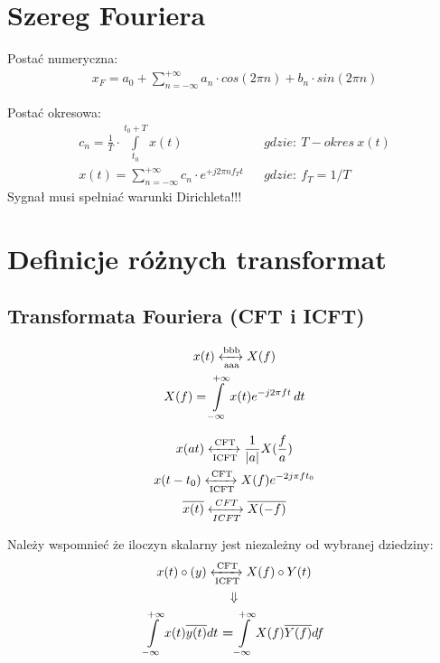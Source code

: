 \section{Szereg Fouriera}
    Postać numeryczna:
    \begin{gather*}
        x_F = a_0 + \sum\limits_{n=-\infty}^{+\infty}a_n\cdot cos\left(2\pi n\right) +b_n\cdot sin\left(2\pi n\right)
    \end{gather*}

    \indent Postać okresowa:
    \begin{align*}
        c_n = \frac{1}{T}\cdot \int\limits_{t_0}^{t_0+T}x(t) && gdzie:\ T - okres\ x(t)\\
% 
        x(t) = \sum\limits_{n=-\infty}^{+\infty}c_n\cdot e^{+j2\pi nf_T t} && gdzie:\ f_T = 1/T 
    \end{align*}
    Sygnał musi spełniać warunki Dirichleta!!!


\section{Definicje różnych transformat}
    \subsection{Transformata Fouriera (CFT i ICFT)}
        \begin{multicols}{2}
            \begin{gather*}
                x(t) \xleftrightarrow[\text{aaa}]{\text{bbb}} X(f)\\
                X(f) = \int\limits_{-\infty}^{+\infty} x(t) e^{-j2\pi f t}  \,dt 
            \end{gather*}

            \begin{gather*}
                x(a t)\xleftrightarrow[\text{ICFT}]{\text{CFT}} \frac{1}{|a|} X(\frac{f}{a})\\
                x(t - t_0)\xleftrightarrow[\text{ICFT}]{\text{CFT}} X(f)e^{-2j\pi ft_0}\\
                \overline{x(t)} \xleftrightarrow[ICFT]{CFT} \overline{X(-f)}
            \end{gather*}
        \end{multicols}
        Należy wspomnieć że iloczyn skalarny jest niezależny od wybranej dziedziny:
        \begin{gather*}
            x(t)\circ(y) \xleftrightarrow[\text{ICFT}]{\text{CFT}} X(f) \circ Y(t)\\
            \Downarrow\\
            \int\limits^{+\infty}_{-\infty}x(t)\overline{y(t)} dt \ \textbf{=} \int\limits^{+\infty}_{-\infty}X(f)\overline{Y(f)}df
        \end{gather*}


